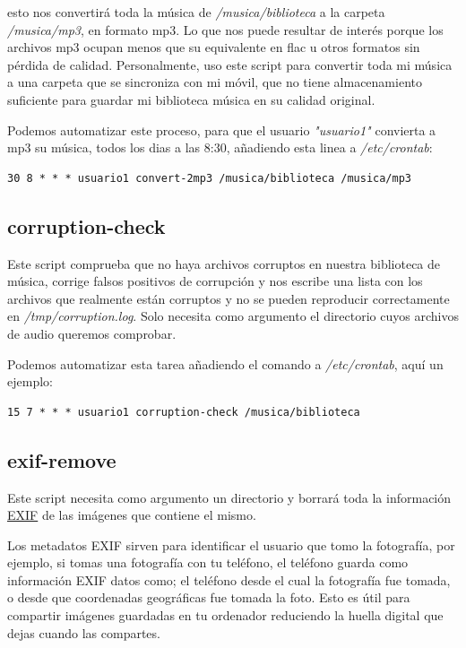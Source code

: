 \documentclass[12pt]{article}
\begin{document}
esto nos convertirá toda la música de \emph{/musica/biblioteca} a la carpeta \emph{/musica/mp3}, en formato mp3. Lo que nos puede resultar de interés porque los archivos mp3 ocupan menos que su equivalente en flac u otros formatos sin pérdida de calidad. Personalmente, uso este script para convertir toda mi música a una carpeta que se sincroniza con mi móvil, que no tiene almacenamiento suficiente para guardar mi biblioteca música en su calidad original.

Podemos automatizar este proceso, para que el usuario \emph{"usuario1"} convierta a mp3 su música, todos los dias a las 8:30, añadiendo esta linea a \emph{/etc/crontab}:

\begin{verbatim}
30 8 * * * usuario1 convert-2mp3 /musica/biblioteca /musica/mp3
\end{verbatim}

\subsection{corruption-check}

Este script comprueba que no haya archivos corruptos en nuestra biblioteca de música, corrige falsos positivos de corrupción y nos escribe una lista con los archivos que realmente están corruptos y no se pueden reproducir correctamente en \emph{/tmp/corruption.log}. Solo necesita como argumento el directorio cuyos archivos de audio queremos comprobar.

Podemos automatizar esta tarea añadiendo el comando a \emph{/etc/crontab}, aquí un ejemplo:

\begin{verbatim}
15 7 * * * usuario1 corruption-check /musica/biblioteca
\end{verbatim}

\subsection{exif-remove}

Este script necesita como argumento un directorio y borrará toda la información \href{https://en.wikipedia.org/wiki/Exif}{EXIF} de las imágenes que contiene el mismo.

Los metadatos EXIF sirven para identificar el usuario que tomo la fotografía, por ejemplo, si tomas una fotografía con tu teléfono, el teléfono guarda como información EXIF datos como; el teléfono desde el cual la fotografía fue tomada, o desde que coordenadas geográficas fue tomada la foto. Esto es útil para compartir imágenes guardadas en tu ordenador reduciendo la huella digital que dejas cuando las compartes.
\end{document}
